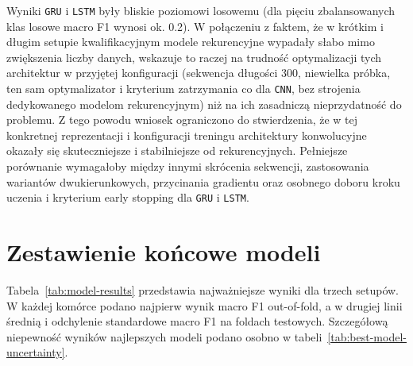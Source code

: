 \documentclass[printmode,pl]{mgr}
\begin{document}
Wyniki \texttt{GRU} i \texttt{LSTM} były bliskie poziomowi losowemu (dla pięciu zbalansowanych klas losowe macro F1 wynosi ok. 0.2). W połączeniu z faktem, że w krótkim i długim setupie kwalifikacyjnym modele rekurencyjne wypadały słabo mimo zwiększenia liczby danych, wskazuje to raczej na trudność optymalizacji tych architektur w przyjętej konfiguracji (sekwencja długości 300, niewielka próbka, ten sam optymalizator i kryterium zatrzymania co dla \texttt{CNN}, bez strojenia dedykowanego modelom rekurencyjnym) niż na ich zasadniczą nieprzydatność do problemu. Z tego powodu wniosek ograniczono do stwierdzenia, że w tej konkretnej reprezentacji i konfiguracji treningu architektury konwolucyjne okazały się skuteczniejsze i stabilniejsze od rekurencyjnych. Pełniejsze porównanie wymagałoby między innymi skrócenia sekwencji, zastosowania wariantów dwukierunkowych, przycinania gradientu oraz osobnego doboru kroku uczenia i kryterium early stopping dla \texttt{GRU} i \texttt{LSTM}.

\section{Zestawienie końcowe modeli}

Tabela~\ref{tab:model-results} przedstawia najważniejsze wyniki dla trzech setupów. W każdej komórce podano najpierw wynik macro F1 out-of-fold, a w drugiej linii średnią i odchylenie standardowe macro F1 na foldach testowych. Szczegółową niepewność wyników najlepszych modeli podano osobno w tabeli~\ref{tab:best-model-uncertainty}.
\end{document}
